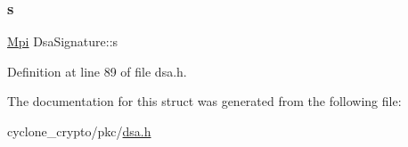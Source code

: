 \subsubsection{\texorpdfstring{s}{s}}
{\footnotesize\ttfamily \hyperlink{structMpi}{Mpi} Dsa\+Signature\+::s}



Definition at line 89 of file dsa.\+h.



The documentation for this struct was generated from the following file\+:\begin{DoxyCompactItemize}
\item 
cyclone\+\_\+crypto/pkc/\hyperlink{dsa_8h}{dsa.\+h}\end{DoxyCompactItemize}
